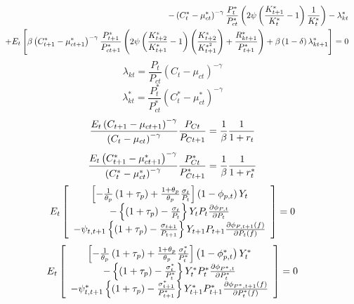 \documentclass{article}
\begin{document}
\begin{eqnarray}
&&-\left( C_{t}^{\ast }-\mu _{ct}^{\ast }\right) ^{-\gamma }\frac{%
P_{t}^{\ast }}{P_{ct}^{\ast }}\left( 2\psi \left( \frac{K_{t+1}^{\ast }}{%
K_{t}^{\ast }}-1\right) \frac{1}{K_{t}^{\ast }}\right) -\lambda _{kt}^{\ast }
\nonumber \\
&&+E_{t}\left[ \beta \left( C_{t+1}^{\ast }-\mu _{ct+1}^{\ast }\right)
^{-\gamma }\frac{P_{t+1}^{\ast }}{P_{ct+1}^{\ast }}\left( 2\psi \left( \frac{%
K_{t+2}^{\ast }}{K_{t+1}^{\ast }}-1\right) \left( \frac{K_{t+2}^{\ast }}{%
K_{t+1}^{\ast ^{2}}}\right) +\frac{R_{kt+1}^{\ast }}{P_{t+1}^{\ast }}\right)
+\beta \left( 1-\delta \right) \lambda _{kt+1}^{\ast }\right] =0
\end{eqnarray}%
\[
\lambda _{kt}=\frac{P_{t}}{P_{ct}}(C_{t}-\mu _{ct})^{-\gamma } 
\]%
\[
\lambda _{kt}^{\ast }=\frac{P_{t}^{\ast }}{P_{ct}^{\ast }}(C_{t}^{\ast }-\mu
_{ct}^{\ast })^{-\gamma } 
\]%
\[
\frac{E_{t}\left( C_{t+1}-\mu _{ct+1}\right) ^{-\gamma }}{\left( C_{t}-\mu
_{ct}\right) ^{-\gamma }}\frac{P_{Ct}}{P_{Ct+1}}=\frac{1}{\beta }\frac{1}{%
1+r_{t}} 
\]%
\[
\frac{E_{t}\left( C_{t+1}^{\ast }-\mu _{ct+1}^{\ast }\right) ^{-\gamma }}{%
\left( C_{t}^{\ast }-\mu _{ct}^{\ast }\right) ^{-\gamma }}\frac{P_{Ct}^{\ast
}}{P_{Ct+1}^{\ast }}=\frac{1}{\beta }\frac{1}{1+r_{t}^{\ast }} 
\]%
\[
E_{t}\left[ 
\begin{array}{c}
\left[ -\frac{1}{\theta _{p}}\left( 1+\tau _{p}\right) +\frac{1+\theta _{p}}{%
\theta _{p}}\frac{\sigma _{t}}{P_{t}}\right] \left( 1-\phi _{p,t}\right)
Y_{t} \\ 
-\left\{ \left( 1+\tau _{p}\right) -\frac{\sigma _{t}}{P_{t}}\right\}
Y_{t}P_{t}\frac{\partial \phi _{P,t}}{\partial P_{t}} \\ 
-\psi _{t,t+1}\left\{ \left( 1+\tau _{p}\right) -\frac{\sigma _{t+1}}{P_{t+1}%
}\right\} Y_{t+1}P_{t+1}\frac{\partial \phi _{P,t+1}\left( f\right) }{%
\partial P_{t}\left( f\right) }%
\end{array}%
\right] =0 
\]%
\[
E_{t}\left[ 
\begin{array}{c}
\left[ -\frac{1}{\theta _{p}}\left( 1+\tau _{p}\right) +\frac{1+\theta _{p}}{%
\theta _{p}}\frac{\sigma _{t}^{\ast }}{P_{t}^{\ast }}\right] \left( 1-\phi
_{p,t}^{\ast }\right) Y_{t}^{\ast } \\ 
-\left\{ \left( 1+\tau _{p}\right) -\frac{\sigma _{t}^{\ast }}{P_{t}^{\ast }}%
\right\} Y_{t}^{\ast }P_{t}^{\ast }\frac{\partial \phi _{P^{\ast },t}}{%
\partial P_{t}^{\ast }} \\ 
-\psi _{t,t+1}^{\ast }\left\{ \left( 1+\tau _{p}\right) -\frac{\sigma
_{t+1}^{\ast }}{P_{t+1}^{\ast }}\right\} Y_{t+1}^{\ast }P_{t+1}^{\ast }\frac{%
\partial \phi _{P^{\ast },t+1}\left( f\right) }{\partial P_{t}^{\ast }\left(
f\right) }%
\end{array}%
\right] =0 
\]%
\end{document}
